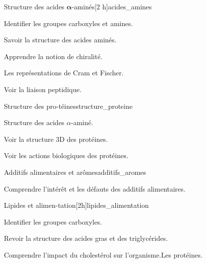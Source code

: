 \begin{multicols}{2}
  \begin{activite}{Structure des acides $\mathbf{\alpha}$-aminés}[2 h]{acides_amines}
    \begin{prerequis}
      \item Identifier les groupes carboxyles et amines.
    \end{prerequis}
    \begin{objectifs}  
      \item Savoir la structure des acides aminés.
      \item Apprendre la notion de chiralité.
      \item Les représentations de Cram et Fischer.
      \item Voir la liaison peptidique.
    \end{objectifs}
  \end{activite}

  \begin{activite}{Structure des pro-téines}{structure_proteine}
    \begin{prerequis}
      \item Structure des acides $\alpha$-aminé.
    \end{prerequis}
    \begin{objectifs}
      \item Voir la structure 3D des protéines.
      \item Voir les actions biologiques des protéines.
    \end{objectifs}
  \end{activite}

  \setcounter{activiteNum}{4}
  \begin{activite}{Additifs alimentaires et arômes}{additifs_aromes}
    \begin{objectifs}
      \item Comprendre l'intérêt et les défauts des additifs alimentaires.
    \end{objectifs}
  \end{activite}

  \setcounter{activiteNum}{2}
  \begin{activite}{Lipides et alimen-tation}[2h]{lipides_alimentation}
    \begin{prerequis}
      \item Identifier les groupes carboxyles.
    \end{prerequis}
    \begin{objectifs}
      \item Revoir la structure des acides gras et des triglycérides.
      \item Comprendre l'impact du cholestérol sur l'organisme.Les protéines.
    \end{objectifs}
  \end{activite}


\end{multicols}
